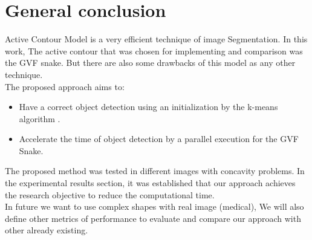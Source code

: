 
\chapter*{General conclusion}\label{ch:general-conclusion}
\lhead{}
\cfoot{\bfseries \thepage}

Active Contour Model is a very efficient technique of image Segmentation. In this work,
The active contour that was chosen for implementing and comparison was the GVF snake.
But there are also some drawbacks of this model as any other technique.\\
The proposed approach aims to:
\begin{itemize}
    \item Have a correct object detection using an initialization by the k-means algorithm .
    \item Accelerate the time of object detection by a parallel execution for the GVF Snake.
\end{itemize}
The proposed method was tested in different images with concavity problems. In the experimental results section,
it was established that our approach achieves the research objective to reduce the computational time.\\
In future we want to use complex shapes with real image (medical), We will also define other metrics of
performance to evaluate and compare our approach with other already existing.